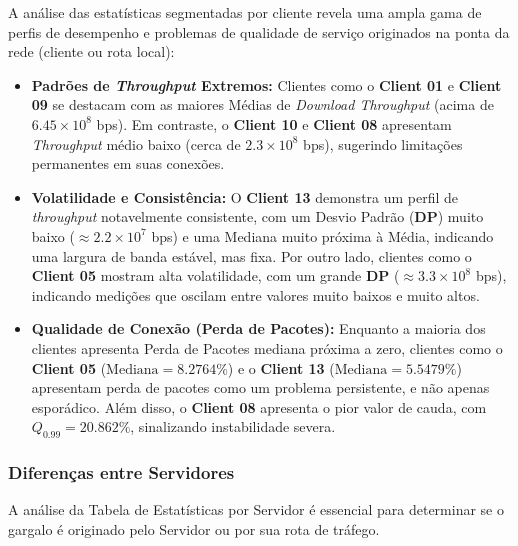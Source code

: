 \documentclass{article}
\begin{document}
A análise das estatísticas segmentadas por cliente revela uma ampla gama de perfis de desempenho e problemas de qualidade de serviço originados na ponta da rede (cliente ou rota local):

\begin{itemize}
	\item \textbf{Padrões de \textit{Throughput} Extremos:} Clientes como o \textbf{Client 01} e \textbf{Client 09} se destacam com as maiores Médias de \textit{Download Throughput} (acima de $6.45 \times 10^8$ bps). Em contraste, o \textbf{Client 10} e \textbf{Client 08} apresentam \textit{Throughput} médio baixo (cerca de $2.3 \times 10^8$ bps), sugerindo limitações permanentes em suas conexões.
	
	\item \textbf{Volatilidade e Consistência:} O \textbf{Client 13} demonstra um perfil de \textit{throughput} notavelmente consistente, com um Desvio Padrão ($\mathbf{DP}$) muito baixo ($\approx 2.2 \times 10^7$ bps) e uma Mediana muito próxima à Média, indicando uma largura de banda estável, mas fixa. Por outro lado, clientes como o \textbf{Client 05} mostram alta volatilidade, com um grande $\mathbf{DP}$ ($\approx 3.3 \times 10^8$ bps), indicando medições que oscilam entre valores muito baixos e muito altos.
	
	\item \textbf{Qualidade de Conexão (Perda de Pacotes):} Enquanto a maioria dos clientes apresenta Perda de Pacotes mediana próxima a zero, clientes como o \textbf{Client 05} ($\text{Mediana} = 8.2764\%$) e o \textbf{Client 13} ($\text{Mediana} = 5.5479\%$) apresentam perda de pacotes como um problema persistente, e não apenas esporádico. Além disso, o \textbf{Client 08} apresenta o pior valor de cauda, com $Q_{0.99} = 20.862\%$, sinalizando instabilidade severa.
\end{itemize}

\subsubsection{Diferenças entre Servidores}

A análise da Tabela de Estatísticas por Servidor é essencial para determinar se o gargalo é originado pelo Servidor ou por sua rota de tráfego.
\end{document}

